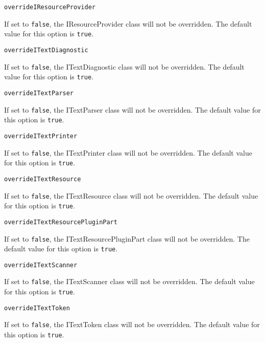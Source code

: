 \noindent\texttt{overrideIResourceProvider}
\begin{myindentpar}{1cm}
If set to \texttt{false}, the IResourceProvider class will not be overridden. The default value for this option is \texttt{true}.
\end{myindentpar}

\noindent\texttt{overrideITextDiagnostic}
\begin{myindentpar}{1cm}
If set to \texttt{false}, the ITextDiagnostic class will not be overridden. The default value for this option is \texttt{true}.
\end{myindentpar}

\noindent\texttt{overrideITextParser}
\begin{myindentpar}{1cm}
If set to \texttt{false}, the ITextParser class will not be overridden. The default value for this option is \texttt{true}.
\end{myindentpar}

\noindent\texttt{overrideITextPrinter}
\begin{myindentpar}{1cm}
If set to \texttt{false}, the ITextPrinter class will not be overridden. The default value for this option is \texttt{true}.
\end{myindentpar}

\noindent\texttt{overrideITextResource}
\begin{myindentpar}{1cm}
If set to \texttt{false}, the ITextResource class will not be overridden. The default value for this option is \texttt{true}.
\end{myindentpar}

\noindent\texttt{overrideITextResourcePluginPart}
\begin{myindentpar}{1cm}
If set to \texttt{false}, the ITextResourcePluginPart class will not be overridden. The default value for this option is \texttt{true}.
\end{myindentpar}

\noindent\texttt{overrideITextScanner}
\begin{myindentpar}{1cm}
If set to \texttt{false}, the ITextScanner class will not be overridden. The default value for this option is \texttt{true}.
\end{myindentpar}

\noindent\texttt{overrideITextToken}
\begin{myindentpar}{1cm}
If set to \texttt{false}, the ITextToken class will not be overridden. The default value for this option is \texttt{true}.
\end{myindentpar}

